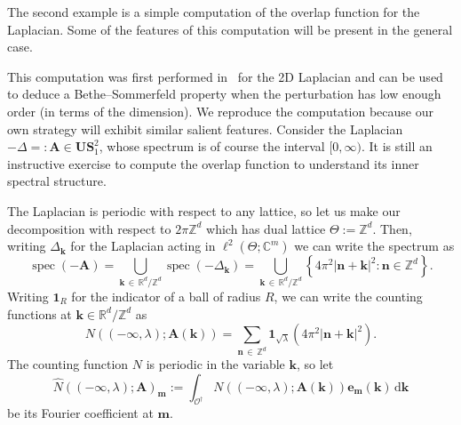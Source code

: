 \documentclass[AHL,Unicode,longabstracts,published]{cedram}
\DeclareMathOperator{\spec}{spec}
\newcommand{\de}{\, \mathrm{d}}
\newcommand{\R}{\mathbb R}
\newcommand{\C}{\mathbb C}
\newcommand{\Z}{\mathbb Z}
\newcommand{\CO}{\mathcal{O}}
\newcommand{\bone}{\boldsymbol 1}
\newcommand{\BA}{\mathbf A}
\newcommand{\BS}{\mathbf S}
\newcommand{\BU}{\mathbf U}
\newcommand{\be}{\mathbf e}
\newcommand{\bk}{\mathbf k}
\newcommand{\bm}{\mathbf m}
\newcommand{\bn}{\mathbf n}
\newcommand{\abs}[1]{\left\lvert #1 \right\rvert}
\newcommand{\set}[1]{\left\{ #1 \right\}}
\begin{document}
The second example is a simple computation of the overlap function for the Laplacian. Some of the features of this computation will be present in the general case.
\begin{exem}\label{ex:heuristic}
This computation was first performed in~\cite{dahlbergtrubowitz} for the 2D Laplacian and can be used to deduce a Bethe--Sommerfeld property when the perturbation has low enough order (in terms of the dimension). We reproduce the computation because our own strategy will exhibit similar salient features. Consider the Laplacian $-\Delta =: \BA \in \BU\BS_1^2$, whose spectrum is of course the interval $[0,\infty)$. It is still an instructive exercise to compute the overlap function to understand its inner spectral structure.

The Laplacian is periodic with respect to any lattice, so let us make our decomposition with respect to $2\pi\Z^d$ which has dual lattice $\Theta := \Z^d$. Then, writing $\Delta_\bk$ for the Laplacian acting in $\ell^2(\Theta;\C^m)$ we can write the spectrum as
\begin{equation}
\spec(-\BA) =
\bigcup_{\bk\,\in\,\R^d/\Z^d} \spec(-\Delta_\bk) = \bigcup_{\bk\,\in\,\R^d/\Z^d} \set{4\pi^2|\bn + \bk|^2 : \bn
\in \Z^d}.
\end{equation}
Writing $\bone_R$ for the indicator of a ball of radius $R$, we can write the counting functions at $\bk \in \R^d/\Z^d$ as
\begin{equation}
N((-\infty,\lambda);\BA(\bk)) = \sum_{\bn \,\in\,\Z^d}
\bone_{\sqrt{\lambda}}\left(4\pi^2 \abs{\bn + \bk}^2\right).
\end{equation}
The counting function $N$ is periodic in the variable $\bk$, so let
\begin{equation}
\widehat N((-\infty,\lambda);\BA)_\bm := \int_{\CO^\dagger} N((-\infty,\lambda);\BA(\bk)) \be_\bm(\bk) \de \bk
\end{equation}
be its Fourier coefficient at $\bm$.


\end{exem}
\end{document}
